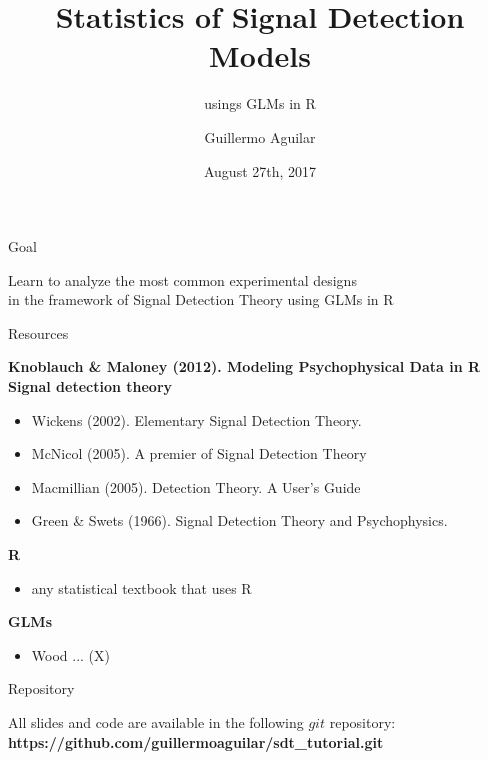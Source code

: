 \documentclass[10pt]{beamer}
\title
{Statistics of Signal Detection Models}
\subtitle{usings GLMs in R} %
\author{Guillermo Aguilar}
\institute[TU Berlin] %
{Technische Universit\"at Berlin}
\date[ECVP 2017]{August 27th, 2017}
\begin{document}
\begin{frame}
  \titlepage
\end{frame}

\begin{frame}{Goal}
\begin{center}
Learn to analyze the most common experimental designs \\
in the framework of Signal Detection Theory using GLMs  in R
\end{center}
\end{frame}

\begin{frame}
\tableofcontents
\end{frame}

\begin{frame}{Resources}

\textbf{Knoblauch \& Maloney (2012). Modeling Psychophysical Data in R}\\
\vspace{10pt}
\textbf{Signal detection theory}
\begin{itemize}
\item Wickens (2002). Elementary Signal Detection Theory.
\item McNicol (2005). A premier of Signal Detection Theory
\item Macmillian (2005). Detection Theory. A User's Guide
\item Green \& Swets (1966). Signal Detection Theory and Psychophysics.
\end{itemize}
\vspace{10pt}
\textbf{R}
\begin{itemize}
\item any statistical textbook that uses R
\end{itemize}
\vspace{10pt}
\textbf{GLMs}
\begin{itemize}
\item Wood ... (X)
\end{itemize}

\end{frame}


\begin{frame}{Repository}

All slides and code are available in the following $git$ repository:\\[10pt]

\textbf{https://github.com/guillermoaguilar/sdt\_tutorial.git
}
\end{frame}
\end{document}
